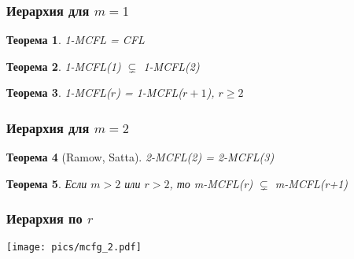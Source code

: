 \documentclass{beamer}
\newtheorem{rutheorem}{Теорема}
\begin{document}
\begin{frame}[fragile]
  
 \frametitle{Иерархия для $m=1$}
 \begin{rutheorem}
  1-MCFL = CFL
 \end{rutheorem}
\pause
 \begin{rutheorem}
  1-MCFL(1) $\varsubsetneq$ 1-MCFL(2) 
 \end{rutheorem}
 \pause
 \begin{rutheorem}
  1-MCFL($r$) = 1-MCFL($r+1$), $r\geq2$ 
 \end{rutheorem}

\end{frame}


\begin{frame}[fragile]
  
 \frametitle{Иерархия для $m=2$}
 \begin{rutheorem}[Ramow, Satta]
  2-MCFL(2) = 2-MCFL(3)
 \end{rutheorem}

 \begin{rutheorem}
 Если $m>2$ или $r>2$, то m-MCFL(r) $\varsubsetneq$ m-MCFL(r+1) 
 \end{rutheorem}
 
\end{frame}


\begin{frame}[fragile]
  
  \frametitle{Иерархия по $r$}
  
  \texttt{[image: pics/mcfg\_2.pdf]}

\end{frame}
\end{document}
